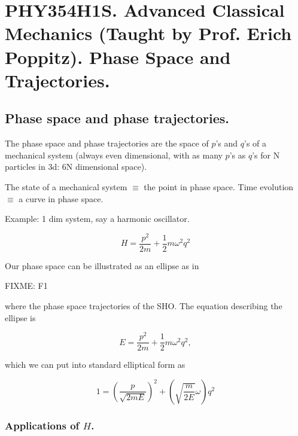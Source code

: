 
%

\chapter{PHY354H1S.  Advanced Classical Mechanics (Taught by Prof. Erich Poppitz).  Phase Space and Trajectories.}
\label{chap:phaseSpaceAndTrajectories}
{}
\date{Feb 29, 2012}

\beginArtWithToc

\section{Phase space and phase trajectories.}

The phase space and phase trajectories are the space of $p$'s and $q$'s of a mechanical system (always even dimensional, with as many $p$'s as $q$'s for N particles in 3d: 6N dimensional space).

The state of a mechanical system $\equiv$ the point in phase space.
Time evolution $\equiv$ a curve in phase space.

Example: 1 dim system, say a harmonic oscillator.

\begin{equation}\label{eqn:phaseSpaceAndTrajectories:10}
H = \frac{p^2}{2m} + \frac{1}{2} m \omega^2 q^2
\end{equation}

Our phase space can be illustrated as an ellipse as in

FIXME: F1

where the phase space trajectories of the SHO.  The equation describing the ellipse is

\begin{equation}\label{eqn:phaseSpaceAndTrajectories:30}
E = \frac{p^2}{2m} + \frac{1}{2} m \omega^2 q^2,
\end{equation}

which we can put into standard elliptical form as

\begin{equation}\label{eqn:phaseSpaceAndTrajectories:50}
1 = \left( \frac{p}{\sqrt{2 m E}}\right)^2 + \left(\sqrt{\frac{m}{2 E}} \omega\right) q^2
\end{equation}

\subsection{Applications of $H$.}

